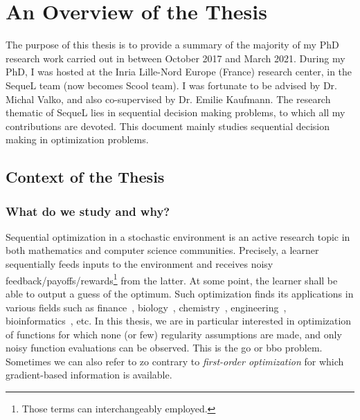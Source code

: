 \chapter{An Overview of the Thesis}\label{chap:intro}
	\minitoc
	\newpage





The purpose of this thesis is to provide a summary of the majority of my PhD research work carried out in between October 2017 and March 2021. During my PhD, I was hosted at the Inria Lille-Nord Europe (France) research center, in the SequeL team (now becomes Scool team). I was fortunate to be advised by Dr. Michal Valko, and also co-supervised by Dr. Emilie Kaufmann. The research thematic of SequeL lies in sequential decision making problems, to which all my contributions are devoted. This document mainly studies sequential decision making in optimization problems.

\section{Context of the Thesis}\label{sec:intro.context}
	
\subsection{What do we study and why?}\label{sec:intro.context.what}

Sequential optimization in a stochastic environment is an active research topic in both mathematics and computer science communities. Precisely, a learner sequentially feeds inputs to the environment and receives noisy feedback/payoffs/rewards\footnote{Those terms can interchangeably employed.} from the latter. At some point, the learner shall be able to output a guess of the optimum. Such optimization finds its applications in various fields such as finance~\citep{ziemba2010}, biology~\citep{durand2018contextual}, chemistry~\citep{floudas2000}, engineering~\citep{wang2007}, bioinformatics~\citep{moles2003}, etc. In this thesis, we are in particular interested in optimization of functions for which none (or few) regularity assumptions are made, and only noisy function evaluations can be observed. This is the \gls{go} or \gls{bbo} problem. Sometimes we can also refer to \gls{zo} 
contrary to \emph{first-order optimization} for which gradient-based information is available.

